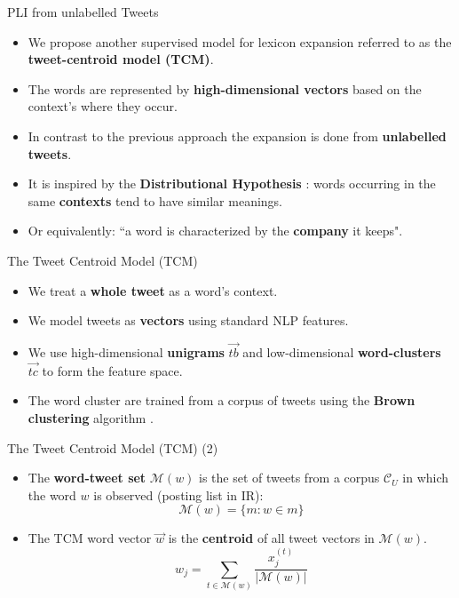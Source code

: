 \documentclass[handout]{beamer}
\begin{document}
\begin{frame}{PLI from unlabelled Tweets}
\begin{scriptsize}
\begin{itemize}
\item We propose another supervised model for lexicon expansion referred to as the \textbf{tweet-centroid model (TCM)}.
\item The words are represented by \textbf{high-dimensional vectors} based on the context's where they occur. 
\item In contrast to the previous approach the expansion is done from \textbf{unlabelled tweets}.
\item It is inspired by the \textbf{Distributional Hypothesis} \cite{harris1954}: words occurring in the same \textbf{contexts} tend to have similar meanings.
\item Or equivalently: ``a word is characterized by the \textbf{company} it keeps".
\end{itemize}
\end{scriptsize}
\end{frame}


\begin{frame}{The Tweet Centroid Model (TCM) }
\begin{scriptsize}
\begin{itemize}
\item We treat a \textbf{whole tweet} as a word's context.
\item We model tweets as \textbf{vectors} using standard NLP features.
\item We use high-dimensional \textbf{unigrams}  $\overrightarrow{tb}$ and low-dimensional \textbf{word-clusters} $\overrightarrow{tc}$ to form the feature space.
\item The word cluster are trained from a corpus of tweets using the \textbf{Brown clustering} algorithm \cite{brown1992class}. 
\end{itemize}
\end{scriptsize}
\end{frame}


\begin{frame}{The Tweet Centroid Model (TCM) (2)}
\begin{scriptsize}
\begin{itemize}
\item The \textbf{word-tweet set} $\mathcal{M}(w)$ is the set of tweets from a corpus $\mathcal{C}_U$ in which the word $w$ is observed (posting list in IR):
\begin{equation}
\mathcal{M}(w)=\{ m: w \in m\}
\end{equation}
\item The TCM word vector $\overrightarrow{w}$ is the \textbf{centroid} of all tweet vectors in $\mathcal{M}(w)$.
\begin{equation}
w_j = \sum_{t \in \mathcal{M}(w)} \frac{x_j^{(t)}}{|\mathcal{M}(w)|}
\end{equation}

\end{itemize}
\end{scriptsize}
\end{frame}
\end{document}
